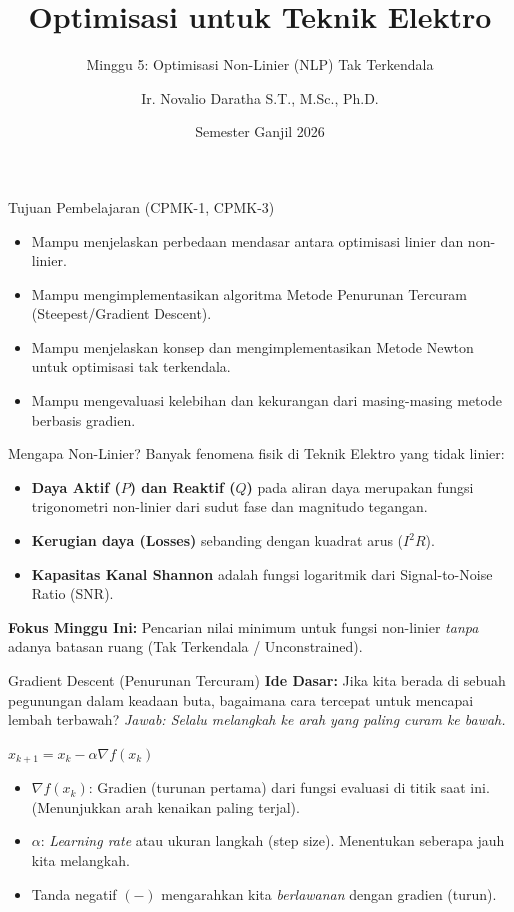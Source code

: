 \documentclass[aspectratio=169]{beamer}
\title{Optimisasi untuk Teknik Elektro}
\subtitle{Minggu 5: Optimisasi Non-Linier (NLP) Tak Terkendala}
\author{Ir. Novalio Daratha S.T., M.Sc., Ph.D.}
\date{Semester Ganjil 2026}
\begin{document}
\begin{frame}
    \titlepage
\end{frame}

\begin{frame}{Tujuan Pembelajaran (CPMK-1, CPMK-3)}
    \begin{itemize}
        \item Mampu menjelaskan perbedaan mendasar antara optimisasi linier dan non-linier.
        \item Mampu mengimplementasikan algoritma Metode Penurunan Tercuram (Steepest/Gradient Descent).
        \item Mampu menjelaskan konsep dan mengimplementasikan Metode Newton untuk optimisasi tak terkendala.
        \item Mampu mengevaluasi kelebihan dan kekurangan dari masing-masing metode berbasis gradien.
    \end{itemize}
\end{frame}

\begin{frame}{Mengapa Non-Linier?}
    Banyak fenomena fisik di Teknik Elektro yang tidak linier:
    \begin{itemize}
        \item \textbf{Daya Aktif ($P$) dan Reaktif ($Q$)} pada aliran daya merupakan fungsi trigonometri non-linier dari sudut fase dan magnitudo tegangan.
        \item \textbf{Kerugian daya (Losses)} sebanding dengan kuadrat arus ($I^2R$).
        \item \textbf{Kapasitas Kanal Shannon} adalah fungsi logaritmik dari Signal-to-Noise Ratio (SNR).
    \end{itemize}
    \textbf{Fokus Minggu Ini:} Pencarian nilai minimum untuk fungsi non-linier \textit{tanpa} adanya batasan ruang (Tak Terkendala / Unconstrained).
\end{frame}

\begin{frame}{Gradient Descent (Penurunan Tercuram)}
    \textbf{Ide Dasar:} Jika kita berada di sebuah pegunungan dalam keadaan buta, bagaimana cara tercepat untuk mencapai lembah terbawah?
    \textit{Jawab: Selalu melangkah ke arah yang paling curam ke bawah.}
    \vspace{0.3cm}
    \begin{tcolorbox}[colback=blue!5,colframe=UNIBBlue,title=Aturan Pembaruan (Update Rule)]
        $x_{k+1} = x_k - \alpha \nabla f(x_k)$
    \end{tcolorbox}
    \begin{itemize}
        \item $\nabla f(x_k)$: Gradien (turunan pertama) dari fungsi evaluasi di titik saat ini. (Menunjukkan arah kenaikan paling terjal).
        \item $\alpha$: \textit{Learning rate} atau ukuran langkah (step size). Menentukan seberapa jauh kita melangkah.
        \item Tanda negatif $(-)$ mengarahkan kita \textit{berlawanan} dengan gradien (turun).
    \end{itemize}
\end{frame}
\end{document}
